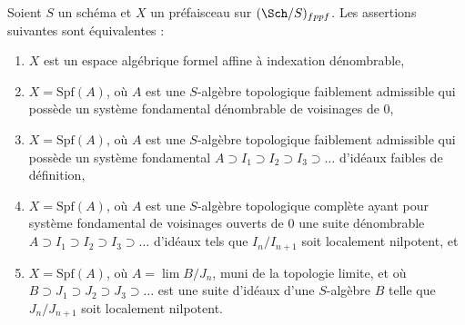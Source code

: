 \begin{lemma}
\label{lemma-countably-indexed}
Soient $S$ un schéma et $X$ un préfaisceau sur $(\Sch/S)_{fppf}$.
Les assertions suivantes sont équivalentes :
\begin{enumerate}
\item $X$ est un espace algébrique formel affine à indexation dénombrable,
\item $X = \text{Spf}(A)$, où $A$ est une $S$-algèbre topologique faiblement
admissible qui possède un système fondamental dénombrable de voisinages de $0$,
\item $X = \text{Spf}(A)$, où $A$ est une $S$-algèbre topologique faiblement
admissible qui possède un système fondamental
$A \supset I_1 \supset I_2 \supset I_3 \supset \ldots$
d'idéaux faibles de définition,
\item $X = \text{Spf}(A)$, où $A$ est une $S$-algèbre topologique complète
ayant pour système fondamental de voisinages ouverts de $0$ une
suite dénombrable $A \supset I_1 \supset I_2 \supset I_3 \supset \ldots$
d'idéaux tels que $I_n/I_{n + 1}$ soit localement nilpotent, et
\item $X = \text{Spf}(A)$, où $A = \lim B/J_n$, muni de la topologie limite,
et où $B \supset J_1 \supset J_2 \supset J_3 \supset \ldots$ est une
suite d'idéaux d'une $S$-algèbre $B$ telle que $J_n/J_{n + 1}$ soit
localement nilpotent.
\end{enumerate}
\end{lemma}

